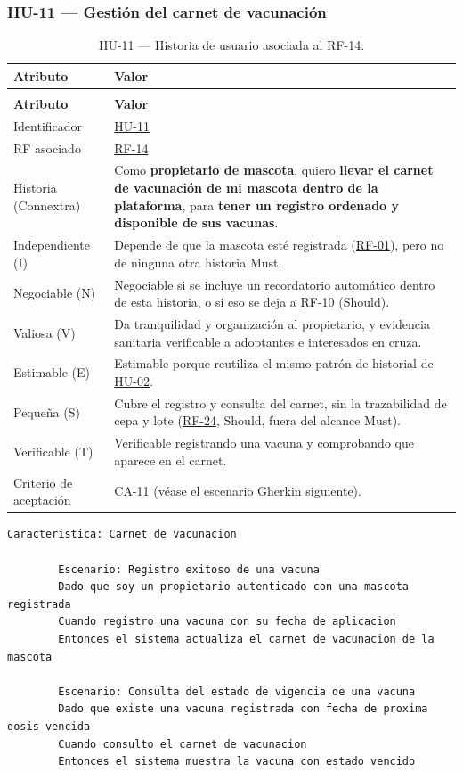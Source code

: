 \documentclass[journal,onecolumn]{IEEEtran}
\makeatletter
\newenvironment{atributos}[2]{%
	\small
	\begin{longtable}{@{}>{\raggedright\arraybackslash}p{4.2cm} >{\raggedright\arraybackslash}p{11.2cm}@{}}
		\caption{#2}\label{tab:#1}\\
		\toprule
		\textbf{Atributo} & \textbf{Valor} \\
		\midrule
		\endfirsthead
		\multicolumn{2}{@{}l}{\small\itshape (continuación)}\\
		\toprule
		\textbf{Atributo} & \textbf{Valor} \\
		\midrule
		\endhead
		\bottomrule
		\endlastfoot
	}{%
	\end{longtable}
	\normalsize
}
\makeatother
\begin{document}
	\subsubsection{HU-11 --- Gestión del carnet de vacunación}
	
	\begin{atributos}{HU-11}{HU-11 --- Historia de usuario asociada al RF-14.}
		Identificador & \hyperref[tab:HU-11]{HU-11} \\
		RF asociado & \hyperref[tab:RF-14]{RF-14} \\
		Historia (Connextra) & Como \textbf{propietario de mascota}, quiero \textbf{llevar el carnet de vacunación de mi mascota dentro de la plataforma}, para \textbf{tener un registro ordenado y disponible de sus vacunas}. \\
		Independiente (I) & Depende de que la mascota esté registrada (\hyperref[tab:RF-01]{RF-01}), pero no de ninguna otra historia Must. \\
		Negociable (N) & Negociable si se incluye un recordatorio automático dentro de esta historia, o si eso se deja a \hyperref[tab:RF-10]{RF-10} (Should). \\
		Valiosa (V) & Da tranquilidad y organización al propietario, y evidencia sanitaria verificable a adoptantes e interesados en cruza. \\
		Estimable (E) & Estimable porque reutiliza el mismo patrón de historial de \hyperref[tab:HU-02]{HU-02}. \\
		Pequeña (S) & Cubre el registro y consulta del carnet, sin la trazabilidad de cepa y lote (\hyperref[tab:RF-24]{RF-24}, Should, fuera del alcance Must). \\
		Verificable (T) & Verificable registrando una vacuna y comprobando que aparece en el carnet. \\
		Criterio de aceptación & \hyperref[lst:ca11]{CA-11} (véase el escenario Gherkin siguiente). \\
	\end{atributos}
	
	\begin{lstlisting}[style=gherkin,caption={CA-11 --- Escenario de aceptación de la historia HU-11.},label={lst:ca11}]
		Caracteristica: Carnet de vacunacion
		
		Escenario: Registro exitoso de una vacuna
		Dado que soy un propietario autenticado con una mascota registrada
		Cuando registro una vacuna con su fecha de aplicacion
		Entonces el sistema actualiza el carnet de vacunacion de la mascota
		
		Escenario: Consulta del estado de vigencia de una vacuna
		Dado que existe una vacuna registrada con fecha de proxima dosis vencida
		Cuando consulto el carnet de vacunacion
		Entonces el sistema muestra la vacuna con estado vencido
	\end{lstlisting}
	
\end{document}
